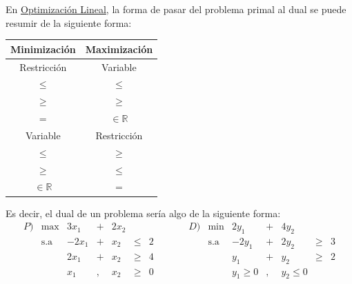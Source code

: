 \documentclass[oneside,spanish]{article}
\theoremstyle{definition}
\theoremstyle{definition}\newtheorem{definicion}{Definición}
\theoremstyle{definition}\newtheorem{ejemplo}{Ejemplo}
\theoremstyle{remark}\newtheorem{nota}{\textsc{Nota}}
\theoremstyle{definition}\newtheorem{proposicion}{Proposición}
\theoremstyle{definition}\newtheorem{problema}{Problema}
\newcommand{\R}{\mathbb{R}}
\begin{document}
En \href{http://es.wikipedia.org/wiki/Programacion_lineal}{Optimizaci\'on Lineal}, la forma de pasar del problema primal al dual se puede resumir de la siguiente forma:
\begin{center}
\begin{tabular}{|c|c|}\hline
Minimizaci\'on & Maximizaci\'on \\ \hline
Restricci\'on & Variable \\
$\leq$ & $\leq$ \\
$\geq$ & $\geq$ \\
$=$ & $\in \R$ \\ \hline
Variable & Restricci\'on \\
$\leq$ & $\geq$ \\
$\geq$ & $\leq$ \\
$\in \R$ & $=$ \\ \hline
\end{tabular}
\end{center}
Es decir, el dual de un problema ser\'ia algo de la siguiente forma:
$$
\begin{array}{ccrcrcccccrcrcc}
P) & \max			& 3x_1   & +   & 2x_2  &   	     &    & \qquad & D) & \min	 		& 2y_1   & + & 4y_2    & 		 &   \\
	& \text{s.a}  & -2x_1   & +   & x_2	&\leq	 & 2 & \qquad &		& \text{s.a}  & -2y_1   & +  & 2y_2    &\geq  & 3 \\
	& 					& 2x_1 & +  & x_2     	&\geq	 & 4 & \qquad & 	 	&					& y_1 & + & y_2    &\geq  & 2 \\
	& 					& x_1   & ,   &  x_2 	    &\geq   & 0 & \qquad & 	 	&					& y_1 \geq 0  & ,  & y_2 \leq 0 	   &		& 
\end{array}
$$
\end{document}
